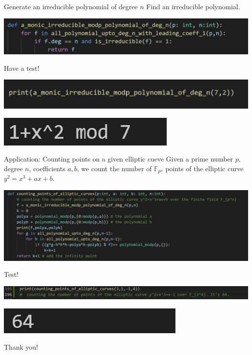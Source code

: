\documentclass{beamer}
\begin{document}
\begin{frame}{Generate an irreducible polynomial of degree $n$}
    Find an irreducible polynomial.
    \begin{center}
        \includegraphics[scale = .5]{generate.png}
    \end{center}
    Have a test!
    \begin{center}
        \includegraphics[scale = .5]{testpoly.png}
    \end{center}
    \begin{center}
        \includegraphics[scale = .5]{testresult1.png}
    \end{center}
\end{frame}

\begin{frame}{Application: Counting points on a given elliptic cueve}
    Given a prime number $p$, degree $n$, coefficients $a,b$, we count the number of
    $\mathbb{F}_{p^n}$ points of the elliptic curve $y^2 = x^3 + ax + b$.
    \begin{center}
        \includegraphics[scale = .5]{count.png}
    \end{center}
    Test!
    \begin{center}
        \includegraphics[scale = .5]{countelliptic.png}
    \end{center}
    \begin{center}
        \includegraphics[scale = .5]{elliptictestresult.png}
    \end{center}

\end{frame}

\begin{frame}
    \huge{Thank you!}
\end{frame}
\end{document}
